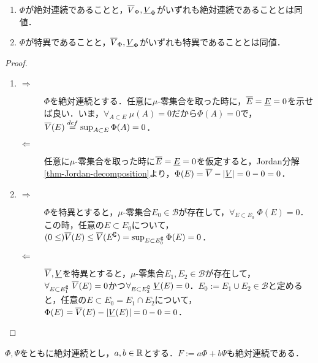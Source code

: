 \documentclass[uplatex, dvipdfmx]{jsreport}
\renewcommand{\B}{\mathcal{B}}
\begin{document}
\begin{theorem}\mbox{}
    \begin{enumerate}
        \item $\Phi$が絶対連続であることと，$\overline{V}_\Phi,\underline{V}_\Phi$がいずれも絶対連続であることとは同値．
        \item $\Phi$が特異であることと，$\overline{V}_\Phi,\underline{V}_\Phi$がいずれも特異であることとは同値．
    \end{enumerate}
\end{theorem}
\begin{proof}\mbox{}
    \begin{enumerate}
        \item \begin{description}
            \item[$\Rightarrow$] $\Phi$を絶対連続とする．任意に$\mu$-零集合を取った時に，$\overline{E}=\underline{E}=0$を示せば良い．いま，$\forall_{A\subset E}\;\mu(A)=0$だから$\Phi(A)=0$で，$\overline{V}(E)\overset{def}{=}\sup_{A\subset E}\Phi(A)=0$．
            \item[$\Leftarrow$] 任意に$\mu$-零集合を取った時に$\overline{E}=\underline{E}=0$を仮定すると，Jordan分解\ref{thm-Jordan-decomposition}より，$\Phi(E)=\overline{V}-\lvert\underline{V}\rvert=0-0=0$．
        \end{description}
        \item \begin{description}
            \item[$\Rightarrow$] $\Phi$を特異とすると，$\mu$-零集合$E_0\in\B$が存在して，$\forall_{E\subset E_0^\comp}\;\Phi(E)=0$．この時，任意の$E\subset E_0^\comp$について，$(0\le)\overline{V}(E)\le\overline{V}(E^\complement)=\sup_{E\subset E_0^\complement}\Phi(E)=0$．
            \item[$\Leftarrow$] $\overline{V},\underline{V}$を特異とすると，$\mu$-零集合$E_1,E_2\in\B$が存在して，$\forall_{E\subset E_1^\complement}\;\overline{V}(E)=0$かつ$\forall_{E\subset E_2^\complement}\;\underline{V}(E)=0$．$E_0:=E_1\cup E_2\in\B$と定めると，任意の$E\subset E_0^\comp=E_1^\comp\cap E_2^\comp$について，$\Phi(E)=\overline{V}(E)-\lvert\underline{V}(E)\rvert=0-0=0$．
        \end{description}
    \end{enumerate}
\end{proof}
\begin{corollary}\label{cor-linearity-of-continuousness}
    $\Phi,\Psi$をともに絶対連続とし，$a,b\in\mathbb{R}$とする．$F:=a\Phi+b\Psi$も絶対連続である．
\end{corollary}
\end{document}
